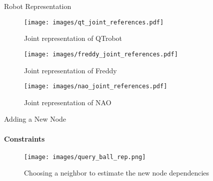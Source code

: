 \documentclass[aspectratio=169]{beamer}
\begin{document}
\begin{frame}{Robot Representation}
	\begin{minipage}{0.32\linewidth}	
		\begin{figure}[h!]
			\texttt{[image: images/qt\_joint\_references.pdf]}
			\caption{Joint representation of QTrobot}
			\label{fig:qt_joint_references}
		\end{figure}
	\end{minipage}
	\begin{minipage}{0.32\linewidth}	
		
		\begin{figure}[h!]
			\texttt{[image: images/freddy\_joint\_references.pdf]}
			\caption{Joint representation of Freddy}
			\label{fig:qt_joint_references}
		\end{figure}
	\end{minipage}
	\begin{minipage}{0.32\linewidth}	
		\begin{figure}[h!]
			\texttt{[image: images/nao\_joint\_references.pdf]}
			\caption{Joint representation of NAO}
			\label{fig:qt_joint_references}
		\end{figure}
	\end{minipage}
\end{frame}

\begin{frame}{Adding a New Node}
	\framesubtitle{Constraints}
		\vspace{-0.1cm}
		\begin{figure}[h!]
			\texttt{[image: images/query\_ball\_rep.png]}
			\caption{Choosing a neighbor to estimate the new node dependencies}
		\end{figure}
\end{frame}
\end{document}
